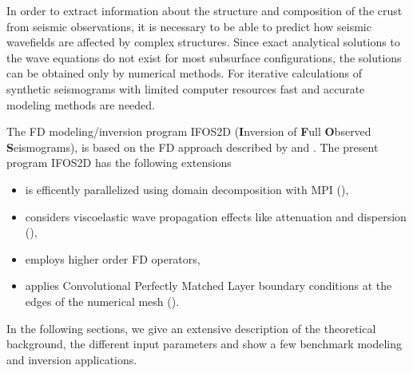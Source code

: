 In order to extract information about the structure and composition of the crust from seismic observations, it is necessary to be able to predict how seismic wavefields are affected by complex structures.
Since exact analytical solutions to the wave equations do not exist for most subsurface configurations, the solutions can be obtained only by numerical methods. For iterative calculations of synthetic seismograms with limited computer resources fast and accurate modeling methods are needed. 

The FD modeling/inversion program IFOS2D (\textbf{I}nversion of \textbf{F}ull \textbf{O}bserved \textbf{S}eismograms), is based on the FD approach described by \cite{virieux:86} and \cite{levander:88}. The present program IFOS2D has the following extensions

\begin{itemize}
\item is efficently parallelized using domain decomposition with MPI (\cite{bohlen:02}),
\item considers viscoelastic wave propagation effects like attenuation and dispersion
(\cite{robertsson:94,blanch:95,bohlen:02}),
\item employs higher order FD operators,
\item applies Convolutional Perfectly Matched Layer boundary conditions at the edges of the numerical mesh (\cite{komatitsch:07}).
\end{itemize}

In the following sections, we give an extensive description of the theoretical background, the different input parameters and show a few benchmark modeling and inversion applications.

